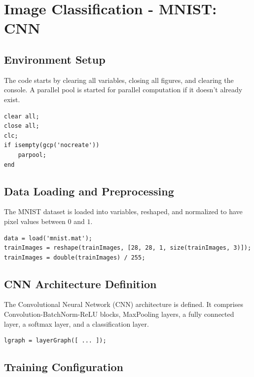 \section{Image Classification - MNIST: CNN}
\label{sec:Image Classification - MNIST:CNN}

\subsection{Environment Setup}

The code starts by clearing all variables, closing all figures, and clearing the console. A parallel pool is started for parallel computation if it doesn't already exist.

\begin{lstlisting}[style=Matlab-editor]
clear all;
close all;
clc;
if isempty(gcp('nocreate'))
    parpool;
end
\end{lstlisting}

\subsection{Data Loading and Preprocessing}

The MNIST dataset is loaded into variables, reshaped, and normalized to have pixel values between \(0\) and \(1\).

\begin{lstlisting}[style=Matlab-editor]
data = load('mnist.mat');
trainImages = reshape(trainImages, [28, 28, 1, size(trainImages, 3)]);
trainImages = double(trainImages) / 255;
\end{lstlisting}

\subsection{CNN Architecture Definition}

The Convolutional Neural Network (CNN) architecture is defined. It comprises Convolution-BatchNorm-ReLU blocks, MaxPooling layers, a fully connected layer, a softmax layer, and a classification layer.

\begin{lstlisting}[style=Matlab-editor]
lgraph = layerGraph([ ... ]);
\end{lstlisting}

\subsection{Training Configuration}

